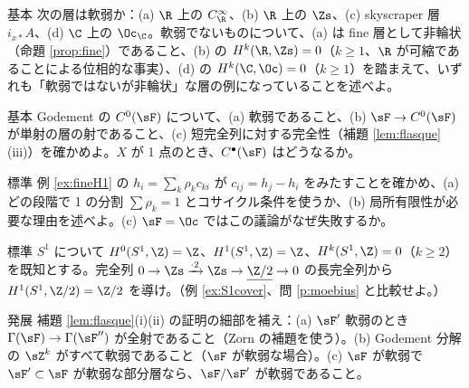 \begin{prob}{基本}\label{p:flasque}
次の層は軟弱か：(a) $\R$ 上の $C^\infty_\R$、(b) $\R$ 上の $\Zs$、(c) skyscraper 層 $i_{x*}A$、(d) $\C$ 上の $\Oc_\C$。軟弱でないものについて、(a) は fine 層として非輪状（命題 \ref{prop:fine}）であること、(b) の $H^k(\R,\Zs)=0$（$k\ge1$、$\R$ が可縮であることによる位相的な事実）、(d) の $H^k(\C,\Oc)=0$（$k\ge1$）を踏まえて、いずれも「軟弱ではないが非輪状」な層の例になっていることを述べよ。
\end{prob}
\begin{prob}{基本}\label{p:godement0}
Godement の $C^0(\sF)$ について、(a) 軟弱であること、(b) $\sF\to C^0(\sF)$ が単射の層の射であること、(c) 短完全列に対する完全性（補題 \ref{lem:flasque}(iii)）を確かめよ。$X$ が 1 点のとき、$C^\bullet(\sF)$ はどうなるか。
\end{prob}
\begin{prob}{標準}\label{p:fineH1}
例 \ref{ex:fineH1} の $h_i=\sum_k\rho_kc_{ki}$ が $c_{ij}=h_j-h_i$ をみたすことを確かめ、(a) どの段階で 1 の分割 $\sum\rho_k=1$ とコサイクル条件を使うか、(b) 局所有限性が必要な理由を述べよ。(c) $\sF=\Oc$ ではこの議論がなぜ失敗するか。
\end{prob}
\begin{prob}{標準}\label{p:Z2}
$S^1$ について $H^0(S^1,\Z)=\Z$、$H^1(S^1,\Z)=\Z$、$H^k(S^1,\Z)=0$（$k\ge2$）を既知とする。完全列 $0\to\Zs\xrightarrow{\cdot2}\Zs\to\underline{\Z/2}\to0$ の長完全列から $H^1(S^1,\Z/2)=\Z/2$ を導け。（例 \ref{ex:S1cover}、問 \ref{p:moebius} と比較せよ。）
\end{prob}
\begin{prob}{発展}\label{p:flasquequot}
補題 \ref{lem:flasque}(i)(ii) の証明の細部を補え：(a) $\sF'$ 軟弱のとき $\Gamma(\sF)\to\Gamma(\sF'')$ が全射であること（Zorn の補題を使う）。(b) Godement 分解の $\sZ^k$ がすべて軟弱であること（$\sF$ が軟弱な場合）。(c) $\sF$ が軟弱で $\sF'\subset\sF$ が軟弱な部分層なら、$\sF/\sF'$ が軟弱であること。
\end{prob}

